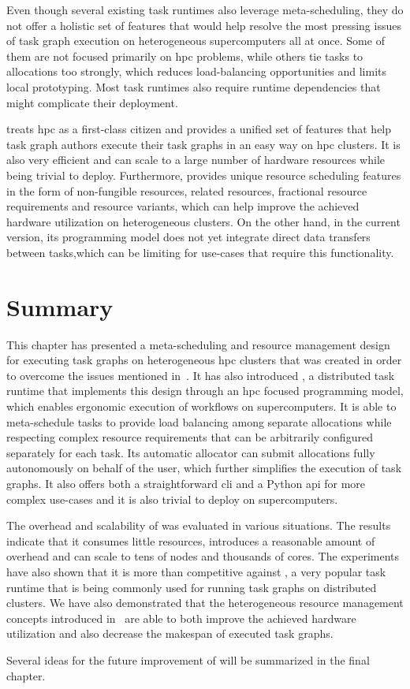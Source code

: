 Even though several existing task runtimes also leverage meta-scheduling, they do not offer a
holistic set of features that would help resolve the most pressing issues of task graph execution
on heterogeneous supercomputers all at once. Some of them are not focused primarily on
\gls{hpc} problems, while others tie tasks to allocations too strongly, which reduces
load-balancing opportunities and limits local prototyping. Most task runtimes also require runtime
dependencies that might complicate their deployment.

\hyperqueue{} treats \gls{hpc} as a first-class citizen and provides a
unified set of features that help task graph authors execute their task graphs in an easy way on
\gls{hpc} clusters. It is also very efficient and can scale to a large number of
hardware resources while being trivial to deploy. Furthermore, \hyperqueue{} provides
unique resource scheduling features in the form of non-fungible resources, related resources,
fractional resource requirements and resource variants, which can help improve the achieved
hardware utilization on heterogeneous clusters. On the other hand, in the current version, its
programming model does not yet integrate direct data transfers between tasks,which can be limiting
for use-cases that require this functionality.

\section*{Summary}
This chapter has presented a meta-scheduling and resource management design for executing task
graphs on heterogeneous \gls{hpc} clusters that was created in order to overcome the
issues mentioned in~. It has also introduced \hyperqueue{}, a
distributed task runtime that implements this design through an \gls{hpc} focused
programming model, which enables ergonomic execution of workflows on supercomputers. It is able to
meta-schedule tasks to provide load balancing among separate allocations while respecting complex
resource requirements that can be arbitrarily configured separately for each task. Its automatic
allocator can submit allocations fully autonomously on behalf of the user, which further simplifies
the execution of \hyperqueue{} task graphs. It also offers both a straightforward
\gls{cli} and a Python \gls{api} for more complex use-cases and it is
also trivial to deploy on supercomputers.

The overhead and scalability of \hyperqueue{} was evaluated in various situations. The
results indicate that it consumes little resources, introduces a reasonable amount of overhead and
can scale to tens of nodes and thousands of cores. The experiments have also shown that it is more
than competitive against \dask{}, a very popular task runtime that is being
commonly used for running task graphs on distributed clusters. We have also demonstrated that
the heterogeneous resource management concepts introduced in~
are able to both improve the achieved hardware utilization and also decrease the makespan of
executed task graphs.

Several ideas for the future improvement of \hyperqueue{} will be summarized in the final
chapter.
